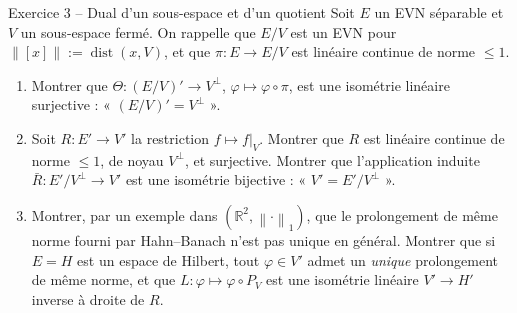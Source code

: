 \documentclass[11pt,a4paper]{article}
\newcommand{\R}{\mathbb{R}}
\newcommand{\dist}{\operatorname{dist}}
\newcommand{\norm}[1]{\left\|#1\right\|}
\theoremstyle{definition}
\begin{document}
\begin{exo}{Exercice 3 -- Dual d'un sous-espace et d'un quotient}
Soit $E$ un EVN séparable et $V$ un sous-espace fermé. On rappelle que $E/V$ est un EVN pour $\norm{[x]}:=\dist(x,V)$, et que $\pi:E\to E/V$ est linéaire continue de norme $\le1$.
\begin{enumerate}[label=(\alph*)]
  \item Montrer que $\Theta:(E/V)'\to V^\perp$, $\varphi\mapsto\varphi\circ\pi$, est une isométrie linéaire surjective : « $(E/V)'=V^\perp$ ».
  \item Soit $R:E'\to V'$ la restriction $f\mapsto f|_V$. Montrer que $R$ est linéaire continue de norme $\le1$, de noyau $V^\perp$, et surjective. Montrer que l'application induite $\bar R:E'/V^\perp\to V'$ est une isométrie bijective : « $V'=E'/V^\perp$ ».
  \item Montrer, par un exemple dans $(\R^2,\norm\cdot_1)$, que le prolongement de même norme fourni par Hahn--Banach n'est pas unique en général. Montrer que si $E=H$ est un espace de Hilbert, tout $\varphi\in V'$ admet un \emph{unique} prolongement de même norme, et que $L:\varphi\mapsto\varphi\circ P_V$ est une isométrie linéaire $V'\to H'$ inverse à droite de $R$.
\end{enumerate}
\end{exo}
\end{document}
